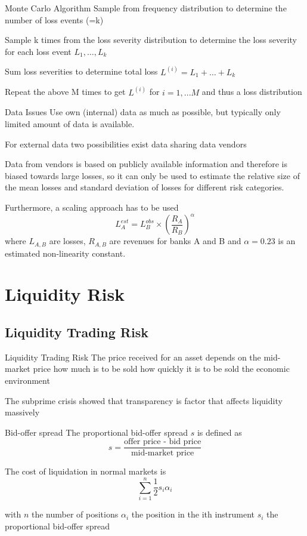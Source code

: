 Monte Carlo Algorithm
	Sample from frequency distribution to determine the number of loss events (=k)
	
	Sample k times from the loss severity distribution to determine the loss severity for each loss event $L_1, \ldots, L_k$
	
	Sum loss severities to determine total loss $L^{(i)}= L_1+\ldots+L_k$
	
	Repeat the above M times to get $L^{(i)}$ for $i=1, ...M$ and thus a loss distribution


Data Issues
	Use own (internal) data as much as possible, but typically only limited amount of data is available.
	
	For external data two possibilities exist
		data sharing
		data vendors

	Data from vendors is based on publicly available information and therefore is biased towards large losses, 
	so it can only be used to estimate the relative size of the mean losses and standard deviation  of losses for different risk categories.
	
	Furthermore, a scaling approach has to be used
		$$
		L_A^{est}=L_B^{obs}\times \left(\frac{R_A}{R_B}\right)^\alpha
		$$
	where $L_{A,B}$ are losses, $R_{A,B}$ are revenues for banks A and B and $\alpha=0.23$ is an estimated non-linearity constant.


\section{Liquidity Risk}
\subsection{Liquidity Trading Risk}

Liquidity Trading Risk
	The price received for an asset depends on
		the mid-market price
		how much is to be sold
		how quickly it is to be sold
		the economic environment

	The subprime crisis showed that transparency is factor that affects liquidity massively


Bid-offer spread
	The proportional bid-offer spread $s$ is defined as
		$$
		s= \frac{\mbox{offer price - bid price}}{\mbox{mid-market price}}
		$$
	
	The cost of liquidation in normal markets is
		$$
		\sum _{i=1}^{n} \frac{1}{2} s_i \alpha_i
		$$

	with
		$n$ the number of positions
		$\alpha_i$ the position in the ith instrument
		$s_i$ the proportional bid-offer spread


